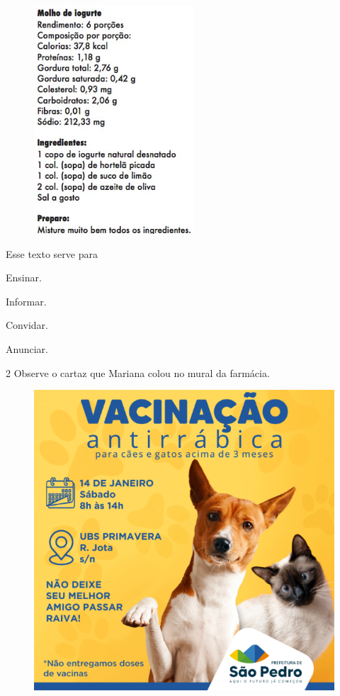 \begin{figure}[htpb!]
\includegraphics[width=.5\textwidth]{media/confederado2.png}
\end{figure}


Esse texto serve para

\begin{escolha}
	\item Ensinar.

	\item Informar.

	\item Convidar.

	\item Anunciar.
\end{escolha}

\pagebreak
\num{2} Observe o cartaz que Mariana colou no mural da farmácia.

\begin{figure}[htpb!]
\centering
\includegraphics[width=.6\textwidth]{media/image115.png}
\end{figure}

